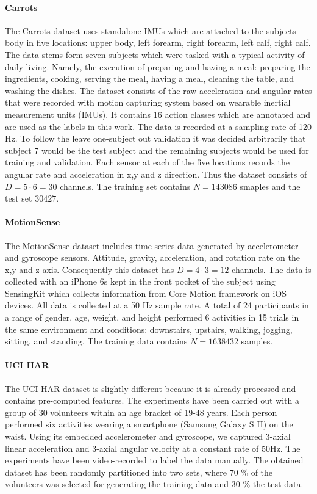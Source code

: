 \documentclass[11pt,titlepage,oneside,openany]{book}
\begin{document}
\paragraph{Carrots}
The Carrots dataset uses standalone IMUs which are attached to the subjects body in five locations: upper body, left forearm, right forearm, left calf, right calf. The data stems form seven subjects which were tasked with a typical activity of daily living. Namely, the execution of preparing and having a meal: preparing the ingredients, cooking, serving the meal, having a meal, cleaning the table, and washing the dishes. The dataset consists of the raw acceleration and angular rates that were recorded with motion capturing system based on wearable inertial measurement units (IMUs). It contains 16 action classes which are annotated and are used as the labels in this work. The data is recorded at a sampling rate of 120 Hz. To follow the leave one-subject out validation it was decided arbitrarily that subject 7 would be the test subject and the remaining subjects would be used for training and validation. Each sensor at each of the five locations records the angular rate and acceleration in x,y and z direction. Thus the dataset consists of $D = 5 \cdot 6 = 30$ channels. The training set contains $N=143086$ smaples and the test set $30427$.

\paragraph{MotionSense}
The MotionSense dataset includes time-series data generated by accelerometer and gyroscope sensors. Attitude, gravity, acceleration, and rotation rate on the x,y and z axis. Consequently this dataset has $D = 4 \cdot 3 = 12$ channels. The data is collected with an iPhone 6s kept in the front pocket of the subject using SensingKit which collects information from Core Motion framework on iOS devices. All data is collected at a 50 Hz sample rate. A total of 24 participants in a range of gender, age, weight, and height performed 6 activities in 15 trials in the same environment and conditions: downstairs, upstairs, walking, jogging, sitting, and standing. The training data contains $N=1638432$ samples. 

\paragraph{UCI HAR}
The UCI HAR dataset is slightly different because it is already processed and contains pre-computed features. The experiments have been carried out with a group of 30 volunteers within an age bracket of 19-48 years. Each person performed six activities wearing a smartphone (Samsung Galaxy S II) on the waist. Using its embedded accelerometer and gyroscope, we captured 3-axial linear acceleration and 3-axial angular velocity at a constant rate of 50Hz. The experiments have been video-recorded to label the data manually. The obtained dataset has been randomly partitioned into two sets, where 70 \% of the volunteers was selected for generating the training data and 30 \% the test data.
\end{document}
